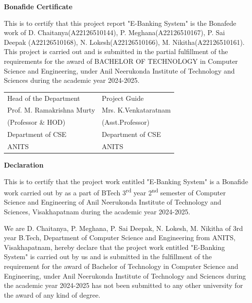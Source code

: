\documentclass[12pt,a4paper]{report}
\begin{document}
\thispagestyle{empty}
\begin{center}
    \Large\textbf{Bonafide Certificate}
\end{center}
\vspace{1cm}

This is to certify that this project report "E-Banking System" is the Bonafede
work of D. Chaitanya(A22126510144), P. Meghana(A22126510167), P. Sai Deepak
(A22126510168), N. Lokesh(A22126510166), M. Nikitha(A22126510161). This project
is carried out and is submitted in the partial fulfillment of the requirements
for the award of BACHELOR OF TECHNOLOGY in Computer Science and Engineering,
under Anil Neerukonda Institute of Technology and Sciences during the academic
year 2024-2025.

\vspace{2cm}
\begin{tabular}{ll}
Head of the Department & Project Guide \\
Prof. M. Ramakrishna Murty & Mrs. K.Venkataratnam \\
(Professor \& HOD) & (Asst.Professor) \\
Department of CSE & Department of CSE \\
ANITS & ANITS
\end{tabular}
\newpage

\thispagestyle{empty}
\begin{center}
    \Large\textbf{Declaration}
\end{center}
\vspace{1cm}

This is to certify that the project work entitled "E-Banking System" is a
Bonafide work carried out by as a part of BTech 3\textsuperscript{rd} year
2\textsuperscript{nd} semester of Computer Science and Engineering of Anil
Neerukonda Institute of Technology and Sciences, Visakhapatnam during the
academic year 2024-2025.

We are D. Chaitanya, P. Meghana, P. Sai Deepak, N. Lokesh, M. Nikitha of 3rd
year B.Tech, Department of Computer Science and Engineering from ANITS,
Visakhapatnam, hereby declare that the project work entitled "E-Banking System"
is carried out by us and is submitted in the fulfillment of the requirement for
the award of Bachelor of Technology in Computer Science and Engineering, under
Anil Neerukonda Institute of Technology and Sciences during the academic year
2024-2025 has not been submitted to any other university for the award of any
kind of degree.
\end{document}
